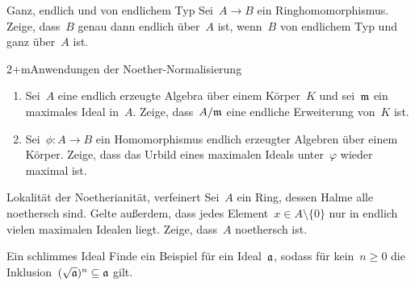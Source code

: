 \documentclass{uebblatt}
\begin{document}

\begin{aufgabe}{2}{Ganz, endlich und von endlichem Typ}
Sei~$A \to B$ ein Ringhomomorphismus. Zeige, dass~$B$ genau dann endlich
über~$A$ ist, wenn~$B$ von endlichem Typ und ganz über~$A$ ist.
\end{aufgabe}

\begin{aufgabe}{2+m}{Anwendungen der Noether-Normalisierung}
\begin{enumerate}
\item Sei~$A$ eine endlich erzeugte Algebra über einem Körper~$K$ und
sei~$\mathfrak{m}$ ein maximales Ideal in~$A$. Zeige, dass~$A/\mathfrak{m}$ eine endliche
Erweiterung von~$K$ ist.
\item Sei~$\phi : A \to B$ ein Homomorphismus endlich erzeugter Algebren über
einem Körper. Zeige, dass das Urbild eines maximalen Ideals unter~$\varphi$ wieder
maximal ist.
\end{enumerate}
\end{aufgabe}

\begin{aufgabe}{2}{Lokalität der Noetherianität, verfeinert}
Sei~$A$ ein Ring, dessen Halme alle noethersch sind. Gelte außerdem, dass
jedes Element~$x \in A \setminus \{0\}$ nur in endlich vielen maximalen Idealen
liegt. Zeige, dass~$A$ noethersch ist.
\end{aufgabe}

\begin{aufgabe}{2}{Ein schlimmes Ideal}
Finde ein Beispiel für ein Ideal~$\mathfrak{a}$, sodass für kein~$n \geq 0$
die Inklusion~$(\sqrt{\mathfrak{a}})^n \subseteq \mathfrak{a}$ gilt.
\end{aufgabe}
\end{document}
